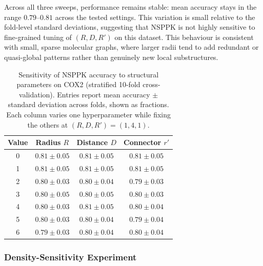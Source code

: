 Across all three sweeps, performance remains stable: mean accuracy stays in the
range $0.79$--$0.81$ across the tested settings. This variation is small relative
to the fold-level standard deviations, suggesting that NSPPK is not highly
sensitive to fine-grained tuning of $(R,D,R')$ on this dataset. This behaviour is
consistent with small, sparse molecular graphs, where larger radii tend to add
redundant or quasi-global patterns rather than genuinely new local substructures.
\begin{table}[H]
\centering
\caption{Sensitivity of NSPPK accuracy to structural parameters on COX2
(stratified 10-fold cross-validation). Entries report mean accuracy $\pm$
standard deviation across folds, shown as fractions. Each column varies one
hyperparameter while fixing the others at $(R,D,R')=(1,4,1)$.}
\label{tab:sensitivity}
\label{tab:coxsensitivity}
\scriptsize
\setlength{\tabcolsep}{4pt}
\begin{tabular}{cccc}
\toprule
Value & Radius $R$ & Distance $D$ & Connector $r'$ \\
\midrule
0 & $0.81 \pm 0.05$ & $0.81 \pm 0.05$ & $0.81 \pm 0.05$ \\
1 & $0.81 \pm 0.05$ & $0.81 \pm 0.05$ & $0.81 \pm 0.05$ \\
2 & $0.80 \pm 0.03$ & $0.80 \pm 0.04$ & $0.79 \pm 0.03$ \\
3 & $0.80 \pm 0.05$ & $0.80 \pm 0.05$ & $0.80 \pm 0.03$ \\
4 & $0.80 \pm 0.03$ & $0.81 \pm 0.05$ & $0.80 \pm 0.04$ \\
5 & $0.80 \pm 0.03$ & $0.80 \pm 0.04$ & $0.79 \pm 0.04$ \\
6 & $0.79 \pm 0.03$ & $0.80 \pm 0.04$ & $0.80 \pm 0.04$ \\
\bottomrule
\end{tabular}
\end{table}
\subsubsection{Density-Sensitivity Experiment}
\label{appendix:density_sensitivity}

